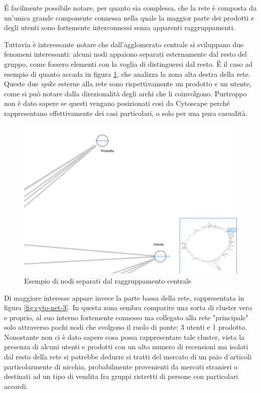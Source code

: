 \documentclass[hidelinks, 12pt]{article}
\begin{document}
É facilmente possibile notare, per quanto sia complessa, che la rete è composta da un'unica grande componente connessa nella quale la maggior parte dei prodotti e degli utenti sono fortemente interconnessi senza apparenti raggruppamenti.

Tuttavia è interessante notare che dall'agglomerato centrale si sviluppano due fenomeni interessanti: alcuni nodi appaiono separati esternamente dal resto del gruppo, come fossero elementi con la voglia di distinguersi dal resto. É il caso ad esempio di quanto accada in figura \ref{fig:cyto-net-2}, che analizza la zona alta destra della rete. Queste due \textit{spike} esterne alla rete sono rispettivamente un prodotto e un utente, come si può notare dalla direzionalità degli archi che li coinvolgono. Purtroppo non è dato sapere se questi vengano posizionati così da Cytoscape perché rappresentano effettivamente dei casi particolari, o solo per una pura casualità.

\begin{figure}[H]
	\centering
	\includegraphics[scale=0.5]{images/03_02_cyto_net_2.png}
	\caption[Esempio di nodi separati dal raggruppamento centrale]{Esempio di nodi separati dal raggruppamento centrale}
	\label{fig:cyto-net-2}
\end{figure}

\vspace{5ex}

Di maggiore interesse appare invece la parte bassa della rete, rappresentata in figura \ref{fig:cyto-net-3}. In questa zona sembra comparire una sorta di cluster vero e proprio, al suo interno fortemente connesso ma collegato alla rete "principale" solo attraverso pochi nodi che svolgono il ruolo di ponte: 3 utenti e 1 prodotto. Nonostante non ci è dato sapere cosa possa rappresentare tale cluster, vista la presenza di alcuni utenti e prodotti con un alto numero di recensioni ma isolati dal resto della rete si potrebbe dedurre si tratti del mercato di un paio d'articoli particolarmente di nicchia, probabilmente provenienti da mercati stranieri o destinati ad un tipo di vendita fra gruppi ristretti di persone con particolari accordi.
\end{document}
